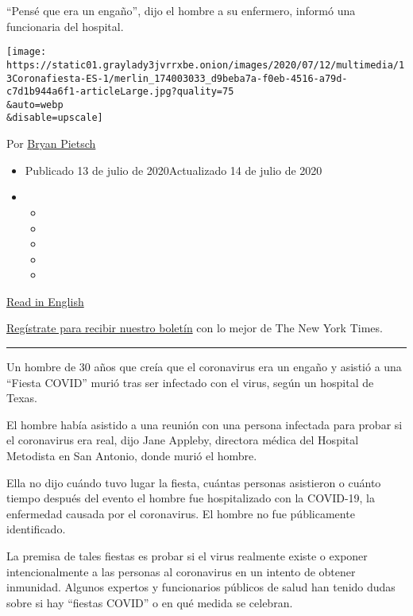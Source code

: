 ``Pensé que era un engaño'', dijo el hombre a su enfermero, informó una
funcionaria del hospital.

\texttt{[image: https://static01.graylady3jvrrxbe.onion/images/2020/07/12/multimedia/13Coronafiesta-ES-1/merlin\_174003033\_d9beba7a-f0eb-4516-a79d-c7d1b944a6f1-articleLarge.jpg?quality=75\\\&auto=webp\\\&disable=upscale]}

Por \href{https://www.nytimes3xbfgragh.onion/by/bryan-pietsch}{Bryan
Pietsch}

\begin{itemize}
\item
  Publicado 13 de julio de 2020Actualizado 14 de julio de 2020
\item
  \begin{itemize}
  \item
  \item
  \item
  \item
  \item
  \end{itemize}
\end{itemize}

\href{https://www.nytimes3xbfgragh.onion/2020/07/12/us/30-year-old-covid-party-death.html}{Read
in English}

\href{https://www.nytimes3xbfgragh.onion/newsletters/el-times}{Regístrate
para recibir nuestro boletín} con lo mejor de The New York Times.

\begin{center}\rule{0.5\linewidth}{\linethickness}\end{center}

Un hombre de 30 años que creía que el coronavirus era un engaño y
asistió a una ``Fiesta COVID'' murió tras ser infectado con el virus,
según un hospital de Texas.

El hombre había asistido a una reunión con una persona infectada para
probar si el coronavirus era real, dijo Jane Appleby, directora médica
del Hospital Metodista en San Antonio, donde murió el hombre.

Ella no dijo cuándo tuvo lugar la fiesta, cuántas personas asistieron o
cuánto tiempo después del evento el hombre fue hospitalizado con la
COVID-19, la enfermedad causada por el coronavirus. El hombre no fue
públicamente identificado.

La premisa de tales fiestas es probar si el virus realmente existe o
exponer intencionalmente a las personas al coronavirus en un intento de
obtener inmunidad. Algunos expertos y funcionarios públicos de salud han
tenido dudas sobre si hay ``fiestas COVID'' o en qué medida se celebran.

